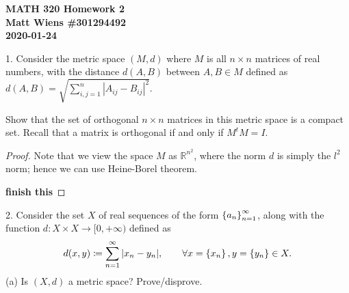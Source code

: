 \documentclass{article}
\newcommand{\R}{\mathbb{R}}
\begin{document}
\textbf{MATH 320 Homework 2} \\
\textbf{Matt Wiens \#301294492} \\
\textbf{2020-01-24}

1. Consider the metric space $(M, d)$ where $M$ is all $n \times n$
matrices of real numbers, with the distance $d(A, B)$ between $A, B
\in M$ defined as $d(A, B)= \sqrt{\sum_{i, j = 1}^n |A_{i j} - B_{i j}|^2}$.

Show that the set of orthogonal $n \times n$ matrices in this metric
space is a compact set. Recall that a matrix is orthogonal if and only
if $M^t M = I$.

\begin{proof}

Note that we view the space $M$ as $\R^{n^2}$, where the norm $d$ is
simply the $l^2$ norm; hence we can use Heine-Borel theorem.

\textbf{finish this}

\end{proof}

\newpage

2. Consider the set $X$ of real sequences of the form $\cbr{a_n}_{ n=
   1}^\infty$, along with the function $d: X \times X \rightarrow [0,
   +\infty)$ defined as
%
\begin{equation*}
    d(x, y) \coloneqq \sum_{n = 1}^\infty |x_n - y_n|,
    \qquad \forall x = \cbr{x_n}, y = \cbr{y_n} \in X
    .
\end{equation*}
%
(a) Is $(X,d)$ a metric space? Prove/disprove.
\end{document}
